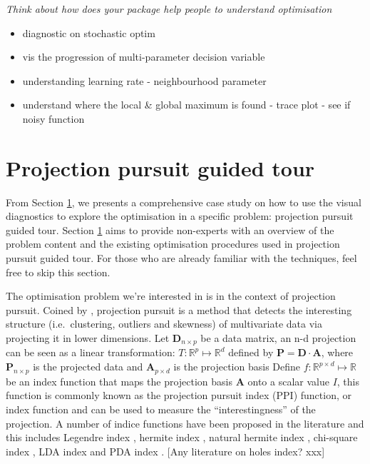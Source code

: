 \documentclass[12pt]{article}
\providecommand{\tightlist}{%
  \setlength{\itemsep}{0pt}\setlength{\parskip}{0pt}}
\begin{document}
\emph{Think about how does your package help people to understand
optimisation}

\begin{itemize}
\tightlist
\item
  diagnostic on stochastic optim
\item
  vis the progression of multi-parameter decision variable
\item
  understanding learning rate - neighbourhood parameter
\item
  understand where the local \& global maximum is found - trace plot -
  see if noisy function
\end{itemize}

\hypertarget{tour}{%
\section{Projection pursuit guided tour}\label{tour}}

From Section \ref{tour}, we presents a comprehensive case study on how
to use the visual diagnostics to explore the optimisation in a specific
problem: projection pursuit guided tour. Section \ref{tour} aims to
provide non-experts with an overview of the problem content and the
existing optimisation procedures used in projection pursuit guided tour.
For those who are already familiar with the techniques, feel free to
skip this section.

The optimisation problem we're interested in is in the context of
projection pursuit. Coined by \citet{friedman1974projection}, projection
pursuit is a method that detects the interesting structure
(i.e.~clustering, outliers and skewness) of multivariate data via
projecting it in lower dimensions. Let \(\mathbf{D}_{n \times p}\) be a
data matrix, an n-d projection can be seen as a linear transformation:
\(T: \mathbb{R}^p \mapsto \mathbb{R}^d\) defined by
\(\mathbf{P} = \mathbf{D} \cdot \mathbf{A}\), where
\(\mathbf{P}_{n \times p}\) is the projected data and
\(\mathbf{A}_{p\times d}\) is the projection basis Define
\(f: \mathbb{R}^{p \times d} \mapsto \mathbb{R}\) be an index function
that maps the projection basis \(\mathbf{A}\) onto a scalar value \(I\),
this function is commonly known as the projection pursuit index (PPI)
function, or index function and can be used to measure the
``interestingness'' of the projection. A number of indice functions have
been proposed in the literature and this includes Legendre index
\citep{friedman1974projection}, hermite index
\citep{hall1989polynomial}, natural hermite index
\citep{cook1993projection}, chi-square index
\citep{posse1995projection}, LDA index \citep{lee2005projection} and PDA
index \citep{lee2010projection}. {[}Any literature on holes index?
xxx{]}
\end{document}
